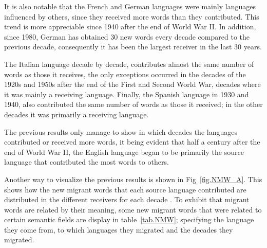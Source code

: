 \documentclass[10pt,letterpaper]{article} %
\begin{document}
	It is also notable that the French and German languages were mainly
	languages influenced by others, since they received more words than
	they contributed. This trend is more appreciable since 1940 after the end of
	World War II. In addition, since 1980, German has obtained 30 new words every
	decade compared to the previous decade, consequently it has been the largest
	receiver in the last 30 years.
	
	The Italian language decade by decade, contributes almost the same number of words as those it receives, the only exceptions occurred in the decades of the 1920s and 1950s after the end of the First and Second World War, decades where it was mainly a receiving language. Finally, the Spanish language in 1930 and 1940, also contributed the same number of words as those it received; in the other decades it was primarily a receiving language.
	
	The previous results only manage to show in which decades the languages
	contributed or received more words, it being evident that half a century after
	the end of World War II, the English language began to be primarily the source
	language that contributed the most words to others. 
	
	Another way to visualize the previous results is shown in Fig~\ref{fig.NMW_A}.
	This shows how the new migrant words that each source language contributed are
	distributed in the different receivers for each decade . To exhibit that migrant
	words are related by their meaning, some new migrant words that were related to
	certain semantic fields are display in table~\ref{tab.NMW}; specifying the
	language they come from, to which languages they migrated and the decades they
	migrated. 
	
	
	
\end{document}
